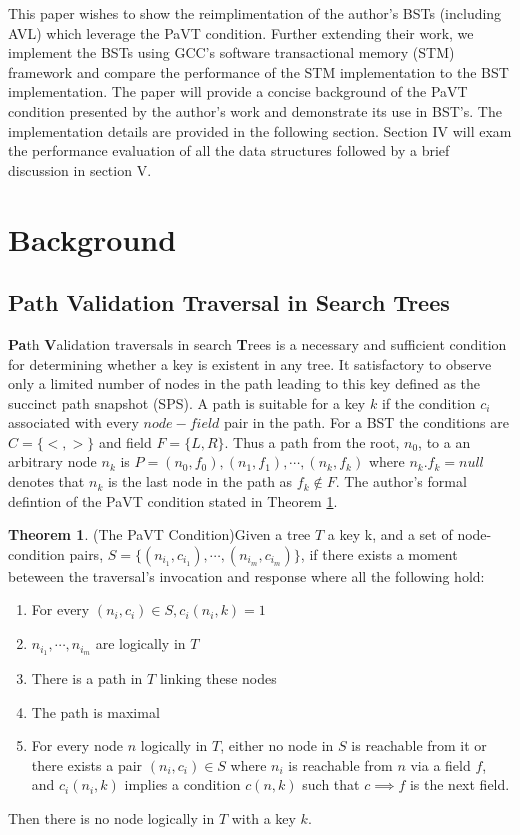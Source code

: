 \documentclass[conference]{IEEEtran}
\theoremstyle{definition}
\theoremstyle{theorem}
\newtheorem{theorem}{Theorem}[section]
\begin{document}
This paper wishes to show the reimplimentation of the author's BSTs (including AVL) which leverage the PaVT condition. Further extending their work, we implement the BSTs using GCC's software transactional memory (STM) framework and compare the performance of the STM implementation to the BST implementation. The paper will provide a concise background of the PaVT condition presented by the author's work and demonstrate its use in BST's. The implementation details are provided in the following section. Section IV will exam the performance evaluation of all the data structures followed by a brief discussion in section V.
\section{Background}
\subsection{Path Validation Traversal in Search Trees}
\textbf{Pa}th \textbf{V}alidation traversals in search \textbf{T}rees is a necessary and sufficient condition for determining whether a key is existent in any tree. It satisfactory to observe only a limited number of nodes in the path leading to this key defined as the succinct path snapshot (SPS). A path is suitable for a key $k$ if the condition $c_i$ associated with every $node-field$ pair in the path. For a BST the conditions are $C=\{<,>\}$ and field $F=\{L, R\}$. Thus a path from the root, $n_0$, to a an arbitrary node $n_k$ is $P=(n_0, f_0), (n_1, f_1),\cdots, (n_k, f_k)$ where $n_k.f_k = null$ denotes that $n_k$ is the last node in the path as $f_k\not \in F$. The author's formal defintion of the PaVT condition stated in Theorem \ref{thm:pavt}.

\begin{theorem} {(The PaVT Condition)}\label{thm:pavt}
Given a tree $T$ a key k, and a set of node-condition pairs, $S=\{(n_{i_1}, c_{i_1}),\cdots, (n_{i_m}, c_{i_m})\}$, if there exists a moment beteween the traversal's invocation and response where all the following hold:
\begin{enumerate}
\item For every $(n_i, c_i) \in  S, c_i(n_i, k) = 1$
\item $n_{i_1},\cdots, n_{i_m}$ are logically in $T$
\item There is a path in $T$ linking these nodes
\item The path is maximal
\item For every node $n$ logically in $T$, either no node in $S$ is reachable from it or there exists a pair $(n_i, c_i)\in S$ where $n_i$ is reachable from $n$ via a field $f$, and $c_i(n_i, k)$ implies a condition $c(n, k)$ such that $c \implies f$ is the next field.
\end{enumerate}
Then there is no node logically in $T$ with a key $k$.
\end{theorem}
\end{document}
